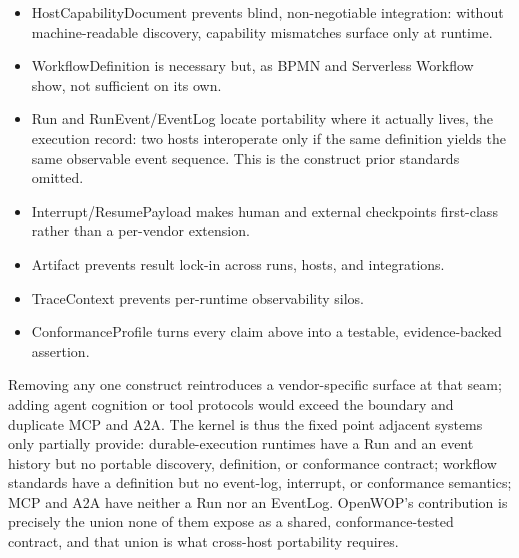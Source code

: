 \documentclass[11pt]{article}
\begin{document}
\begin{itemize}[leftmargin=*]
\item HostCapabilityDocument prevents blind, non-negotiable integration: without machine-readable discovery, capability mismatches surface only at runtime.
\item WorkflowDefinition is necessary but, as BPMN and Serverless Workflow show, not sufficient on its own.
\item Run and RunEvent/EventLog locate portability where it actually lives, the execution record: two hosts interoperate only if the same definition yields the same observable event sequence. This is the construct prior standards omitted.
\item Interrupt/ResumePayload makes human and external checkpoints first-class rather than a per-vendor extension.
\item Artifact prevents result lock-in across runs, hosts, and integrations.
\item TraceContext prevents per-runtime observability silos.
\item ConformanceProfile turns every claim above into a testable, evidence-backed assertion.
\end{itemize}
Removing any one construct reintroduces a vendor-specific surface at that seam; adding agent cognition or tool protocols would exceed the boundary and duplicate MCP and A2A. The kernel is thus the fixed point adjacent systems only partially provide: durable-execution runtimes have a Run and an event history but no portable discovery, definition, or conformance contract; workflow standards have a definition but no event-log, interrupt, or conformance semantics; MCP and A2A have neither a Run nor an EventLog. OpenWOP's contribution is precisely the union none of them expose as a shared, conformance-tested contract, and that union is what cross-host portability requires.
\end{document}
